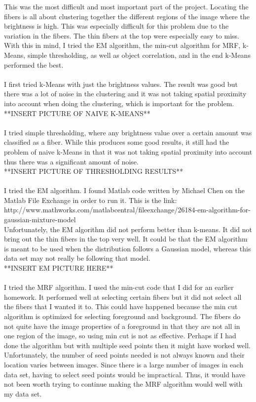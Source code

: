\documentclass[11pt,psfig]{article}
\begin{document}
This was the most difficult and most important part of the project. Locating the fibers is all about clustering together the different regions of the image where the brightness is high. This was especially difficult for this problem due to the variation in the fibers. The thin fibers at the top were especially easy to miss. With this in mind, I tried the EM algorithm, the min-cut algorithm for MRF, k-Means, simple thresholding, as well as object correlation, and in the end k-Means performed the best. \\
\\
I first tried k-Means with just the brightness values. The result was good but there was a lot of noise in the clustering and it was not taking spatial proximity into account when doing the clustering, which is important for the problem. \\
**INSERT PICTURE OF NAIVE K-MEANS**\\
\\
I tried simple thresholding, where any brightness value over a certain amount was classified as a fiber. While this produces some good results, it still had the problem of naive k-Means in that it was not taking spatial proximity into account thus there was a significant amount of noise. \\
**INSERT PICTURE OF THRESHOLDING RESULTS**\\
\\
I tried the EM algorithm. I found Matlab code written by Michael Chen on the Matlab File Exchange in order to run it. This is the link:\\
http://www.mathworks.com/matlabcentral/fileexchange/26184-em-algorithm-for-gaussian-mixture-model\\
Unfortunately, the EM algorithm did not perform better than k-means. It did not bring out the thin fibers in the top very well. It could be that the EM algorithm is meant to be used when the distribution follows a Gaussian model, whereas this data set may not really be following that model. \\
**INSERT EM PICTURE HERE**\\
\\
I tried the MRF algorithm. I used the min-cut code that I did for an earlier homework. It performed well at selecting certain fibers but it did not select all the fibers that I wanted it to. This could have happened because the min cut algorithm is optimized for selecting foreground and background. The fibers do not quite have the image properties of a foreground in that they are not all in one region of the image, so using min cut is not as effective. Perhaps if I had done the algorithm but with multiple seed points then it might have worked well. Unfortunately, the number of seed points needed is not always known and their location varies between images. Since there is a large number of images in each data set, having to select seed points would be impractical. Thus, it would have not been worth trying to continue making the MRF algorithm would well with my data set. \\
\end{document}
